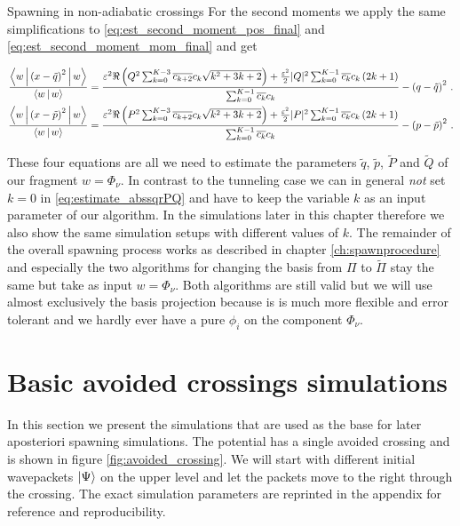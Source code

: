 \begin{chapter}{Spawning in non-adiabatic crossings}
For the second moments we apply the same simplifications to \eqref{eq:est_second_moment_pos_final}
and \eqref{eq:est_second_moment_mom_final} and get

\begin{align} \label{eq:est_second_moment_pos_na}
  \frac{\Braket{w|\left(x-\tilde{q}\right)^2|w}}{\Braket{w|w}} & =
  \frac{
    \varepsilon^2 \Re \left( Q^2 \sum_{k=0}^{K-3} \overline{c_{k+2}} c_{k} \sqrt{k^2+3k+2} \right)
    + \frac{\varepsilon^2}{2} |Q|^2 \sum_{k=0}^{K-1} \overline{c_k} c_k \left(2k+1\right)
  }{\sum_{k=0}^{K-1} \overline{c_k} c_k}
  - \left(q - \tilde{q}\right)^2 \,.
  \\ \label{eq:est_second_moment_mom_na}
  \frac{\Braket{w|\left(x-\tilde{p}\right)^2|w}}{\Braket{w|w}} & =
  \frac{
    \varepsilon^2 \Re \left( P^2 \sum_{k=0}^{K-3} \overline{c_{k+2}} c_{k} \sqrt{k^2+3k+2} \right)
    + \frac{\varepsilon^2}{2} |P|^2 \sum_{k=0}^{K-1} \overline{c_k} c_k \left(2k+1\right)
  }{\sum_{k=0}^{K-1} \overline{c_k} c_k}
  - \left(p - \tilde{p}\right)^2 \,.
\end{align}

These four equations are all we need to estimate the parameters $\tilde{q}$, $\tilde{p}$,
$\tilde{P}$ and $\tilde{Q}$ of our fragment $w = \Phi_\nu$. In contrast to the tunneling
case we can in general \emph{not} set $k=0$ in \eqref{eq:estimate_abssqrPQ} and have
to keep the variable $k$ as an input parameter of our algorithm. In the simulations later
in this chapter therefore we also show the same simulation setups with different values
of $k$. The remainder of the overall spawning process works as described in chapter
\ref{ch:spawnprocedure} and especially the two algorithms for changing the basis
from $\Pi$ to $\tilde{\Pi}$ stay the same but take as input $w = \Phi_\nu$. Both
algorithms are still valid but we will use almost exclusively the basis projection
because is is much more flexible and error tolerant and we hardly ever have a pure
$\phi_i$ on the component $\Phi_\nu$.


\section{Basic avoided crossings simulations}

In this section we present the simulations that are used as the base for later
aposteriori spawning simulations. The potential has a single avoided crossing
and is shown in figure \ref{fig:avoided_crossing}. We will start with different
initial wavepackets $\Ket{\Psi}$ on the upper level and let the packets move to
the right through the crossing. The exact simulation parameters are reprinted in
the appendix for reference and reproducibility.


\end{chapter}
